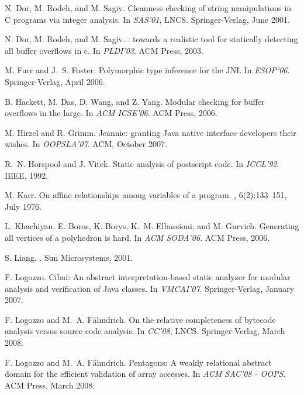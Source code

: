 \documentclass[10pt]{sigplanconf}
\begin{document}
\begin{thebibliography}{10}
N{.} Dor, M{.} Rodeh, and M{.} Sagiv.
\newblock Cleanness checking of string manipulations in {C} programs via
  integer analysis.
\newblock In {\em SAS'01}, LNCS. Springer-Verlag, June 2001.

N{.} Dor, M{.} Rodeh, and M{.} Sagiv.
: towards a realistic tool for statically detecting all buffer
  overflows in c.
\newblock In {\em PLDI'03}. ACM Press, 2003.

M{.} Furr and J{.}~S{.} Foster.
\newblock Polymorphic type inference for the {JNI}.
\newblock In {\em ESOP'06}. Springer-Verlag, April 2006.

B{.} Hackett, M{.} Das, D{.} Wang, and Z{.} Yang.
\newblock Modular checking for buffer overflows in the large.
\newblock In {\em ACM ICSE'06}. ACM Press, 2006.

M{.} Hirzel and R{.} Grimm.
\newblock Jeannie: granting {Java} native interface developers their wishes.
\newblock In {\em OOPSLA'07}. ACM, October 2007.

R{.}~N{.} Horspool and J{.} Vitek.
\newblock Static analysis of postscript code.
\newblock In {\em ICCL'92}. IEEE, 1992.

M{.} Karr.
\newblock On affine relationships among variables of a program.
, 6(2):133--151, July 1976.

L{.} Khachiyan, E{.} Boros, K{.} Borys, K{.}~M{.} Elbassioni, and M{.} Gurvich.
\newblock Generating all vertices of a polyhedron is hard.
\newblock In {\em ACM SODA'06}. ACM Press, 2006.

S{.} Liang.
.
\newblock Sun Microsystems, 2001.

F{.} Logozzo.
\newblock Cibai: An abstract interpretation-based static analyzer for modular
  analysis and verification of {Java} classes.
\newblock In {\em VMCAI'07}. Springer-Verlag, January 2007.

F{.} Logozzo and M{.}~A{.} F\"ahndrich.
\newblock On the relative completeness of bytecode analysis versus source code
  analysis.
\newblock In {\em CC'08}, LNCS. Springer-Verlag, March 2008.

F{.} Logozzo and M{.}~A{.} F\"ahndrich.
\newblock Pentagons: A weakly relational abstract domain for the efficient
  validation of array accesses.
\newblock In {\em ACM SAC'08 - OOPS}. ACM Press, March 2008.


\end{thebibliography}
\end{document}
